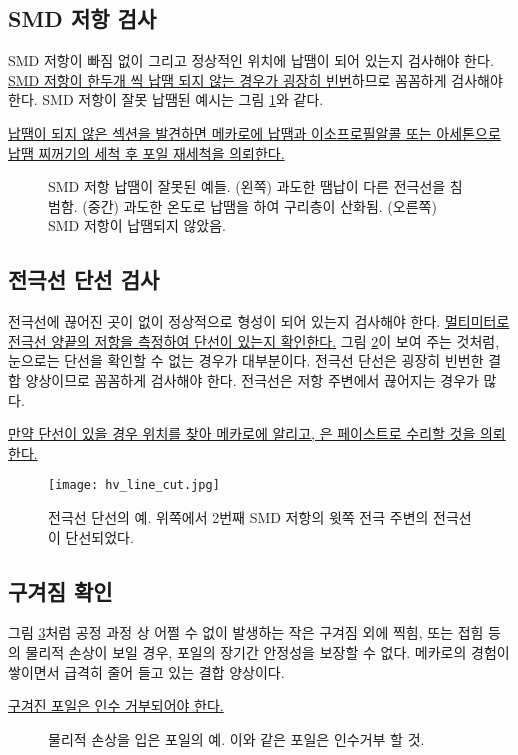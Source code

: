 \subsection{SMD 저항 검사}
SMD 저항이 빠짐 없이 그리고 정상적인 위치에 납땜이 되어 있는지 검사해야 한다. \uline{SMD 저항이 한두개 씩 납땜 되지 않는 경우가 굉장히 빈번}하므로 꼼꼼하게 검사해야 한다. SMD 저항이 잘못 납땜된 예시는 그림 \ref{fig:bad_solder}와 같다.

\uline{납땜이 되지 않은 섹션을 발견하면 메카로에 납땜과 이소프로필알콜 또는 아세톤으로 납땜 찌꺼기의 세척 후 포일 재세척을 의뢰한다.}

\begin{figure}[htb]
  \centering
  \caption[SMD 저항 납땜이 잘못된 예]{SMD 저항 납땜이 잘못된 예들. (왼쪽) 과도한 땜납이 다른 전극선을 침범함. (중간) 과도한 온도로 납땜을 하여 구리층이 산화됨. (오른쪽) SMD 저항이 납땜되지 않았음.}
  \label{fig:bad_solder}
\end{figure}

\subsection{전극선 단선 검사}
전극선에 끊어진 곳이 없이 정상적으로 형성이 되어 있는지 검사해야 한다. \uline{멀티미터로 전극선 양끝의 저항을 측정하여 단선이 있는지 확인한다.} 그림 \ref{fig:hv_line_cut}이 보여 주는 것처럼, 눈으로는 단선을 확인할 수 없는 경우가 대부분이다. 전극선 단선은 굉장히 빈번한 결합 양상이므로 꼼꼼하게 검사해야 한다. 전극선은 저항 주변에서 끊어지는 경우가 많다.

\uline{만약 단선이 있을 경우 위치를 찾아 메카로에 알리고, 은 페이스트로 수리할 것을 의뢰한다.}

\begin{figure}[htb]
  \centering
  \texttt{[image: hv\_line\_cut.jpg]}
  \caption[전극선 단선의 예]{전극선 단선의 예. 위쪽에서 2번째 SMD 저항의 윗쪽 전극 주변의 전극선이 단선되었다.}
  \label{fig:hv_line_cut}
\end{figure}

\subsection{구겨짐 확인}
그림 \ref{fig:example_damaged_foils}처럼 공정 과정 상 어쩔 수 없이 발생하는 작은 구겨짐 외에 찍힘, 또는 접힘 등의 물리적 손상이 보일 경우, 포일의 장기간 안정성을 보장할 수 없다. 메카로의 경험이 쌓이면서 급격히 줄어 들고 있는 결합 양상이다.

\uline{구겨진 포일은 인수 거부되어야 한다.}

\begin{figure}[htb]
  \centering
  \caption[물리적 손상을 입은 포일의 예]{물리적 손상을 입은 포일의 예. 이와 같은 포일은 인수거부 할 것.}
  \label{fig:example_damaged_foils}
\end{figure}
